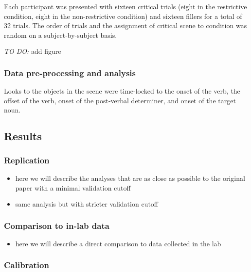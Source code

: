 \documentclass[
  english,
  man,floatsintext]{apa6}
\providecommand{\tightlist}{%
  \setlength{\itemsep}{0pt}\setlength{\parskip}{0pt}}
\begin{document}
Each participant was presented with sixteen critical trials (eight in the restrictive condition, eight in the non-restrictive condition) and sixteen fillers for a total of 32 trials. The order of trials and the assignment of critical scene to condition was random on a subject-by-subject basis.

\emph{TO DO:} add figure

\hypertarget{data-pre-processing-and-analysis}{%
\subsubsection{Data pre-processing and analysis}\label{data-pre-processing-and-analysis}}

Looks to the objects in the scene were time-locked to the onset of the verb, the offset of the verb, onset of the post-verbal determiner, and onset of the target noun.

\hypertarget{results}{%
\subsection{Results}\label{results}}

\hypertarget{replication}{%
\subsubsection{Replication}\label{replication}}

\begin{itemize}
\item
  here we will describe the analyses that are as close as possible to the original paper with a minimal validation cutoff
\item
  same analysis but with stricter validation cutoff
\end{itemize}

\hypertarget{comparison-to-in-lab-data}{%
\subsubsection{Comparison to in-lab data}\label{comparison-to-in-lab-data}}

\begin{itemize}
\tightlist
\item
  here we will describe a direct comparison to data collected in the lab
\end{itemize}

\hypertarget{calibration}{%
\subsubsection{Calibration}\label{calibration}}
\end{document}
